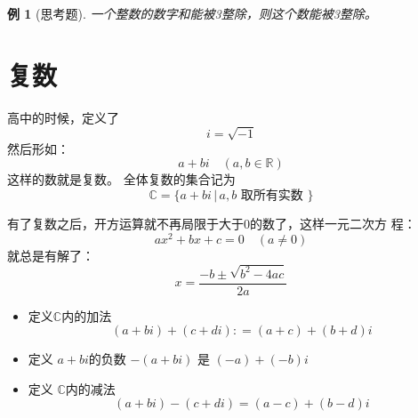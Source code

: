\documentclass[13pt,fontset=mac]{ctexbeamer}
\newtheorem{exa}{例}
\begin{document}
\begin{frame}
	\begin{exa}[思考题]
一个整数的数字和能被3整除，则这个数能被3整除。
	\end{exa}

\end{frame}


%




\section{复数}
\begin{frame}
	高中的时候，定义了
	\[
	i=\sqrt{-1}
	\]
	然后形如：
	\[
	a+b i \quad(a, b \in \mathbb{R})
	\]
	这样的数就是复数。
	全体复数的集合记为
	\[
	\mathbb{C}=\{a+b i \, | \, a, b \text { 取所有实数 }\}
	\]
	
	
	有了复数之后，开方运算就不再局限于大于0的数了，这样一元二次方 程：
	\[
	a x^{2}+b x+c=0 \quad(a \neq 0)
	\]
	就总是有解了：
	\[
	x=\frac{-b \pm \sqrt{b^{2}-4 a c}}{2 a}
	\]
	
	
\end{frame}

\begin{frame}
	\begin{itemize}
		\item 定义$\mathbb{C}$内的加法
		$$(a+b i)+(c+d i)  : =(a+c)+(b+d) i $$
		
		\item 定义 $a+b {i}$的负数 $-(a+b {i})${ 是 } $(-a)+(-b) {i}$
		
		\item 定义  $\mathbb{C}$内的减法 $$(a+b i)-(c+d i) =(a-c)+(b-d) i $$
	\end{itemize}
	
\end{frame}
\end{document}
